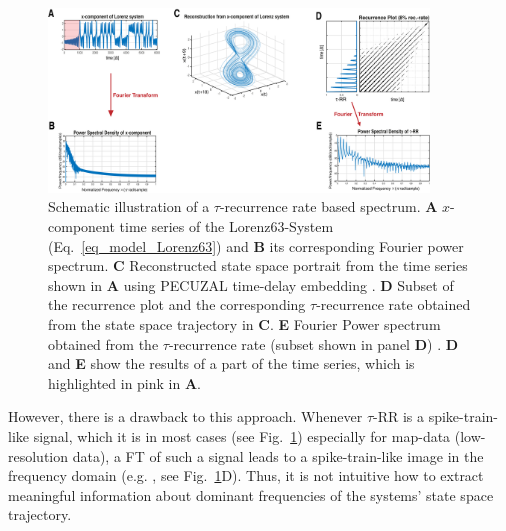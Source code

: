 \documentclass[entropy,article,submit,pdftex,moreauthors]{Definitions/mdpi}
\begin{document}
\begin{figure}
 \centering
 \includegraphics[width=0.9\textwidth]{./figures/fig_tau_rr_spectrum_example}
 \caption{Schematic illustration of a $\tau$-recurrence rate based spectrum. \textbf{A} $x$-component time series of the Lorenz63-System (Eq.~\eqref{eq_model_Lorenz63}) and 
 \textbf{B} its corresponding Fourier power spectrum. 
 \textbf{C} Reconstructed state space portrait from the time series shown in \textbf{A} using PECUZAL time-delay embedding \cite{Kraemer2021}. 
 \textbf{D} Subset of the recurrence plot and the corresponding $\tau$-recurrence rate obtained from the state space trajectory in \textbf{C}. 
 \textbf{E} Fourier Power spectrum obtained from the $\tau$-recurrence rate (subset shown in panel \textbf{D}) \cite{Zbilut2008}. \textbf{D} and \textbf{E} show the results of a part of the time series, 
 which is highlighted in pink in \textbf{A}.
 }\label{fig_tau_rr_spectrum_example}
\end{figure}

However, there is a drawback to this approach. Whenever $\tau$-RR is a spike-train-like signal, which it is in most cases (see Fig.~\ref{fig_tau_rr_spectrum_example}) especially for 
map-data (low-resolution data), a FT of such a signal leads to a spike-train-like image in the frequency domain (e.g. \cite{Schild1982,Cordoba1989}, see 
Fig.~\ref{fig_tau_rr_spectrum_example}D). Thus, it is not intuitive how to extract meaningful information about dominant frequencies of the systems' state space trajectory. 
\end{document}
